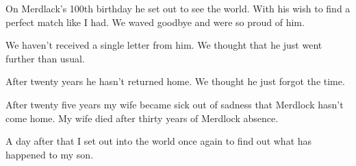 \documentclass[letterpaper,10pt,twoside,twocolumn,openany]{book}
\begin{document}
		On Merdlack's 100th birthday he set out to see the world. With his wish to find a perfect match like I had. We waved goodbye and were so proud of him.
		
		We haven't received a single letter from him. We thought that he just went further than usual.
		
		After twenty years he hasn't returned home. We thought he just forgot the time. 
		
		After twenty five years my wife became sick out of sadness that Merdlock hasn't come home.
		My wife died after thirty years of Merdlock absence. 
		
		A day after that I set out into the world once again to find out what has happened to my son.  

	
	\vfill\null

	


		
		
		

	
\end{document}
